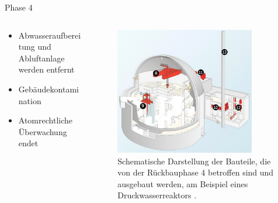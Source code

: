 \begin{frame}{Phase 4}
  \begin{columns}

    \begin{column}{0.48\textwidth}
      \begin{itemize}
        \setlength\itemsep{1.2em}
        \item{ Abwasseraufbereitung und Abluftanlage werden entfernt}
        \item{ Gebäudekontamination }
        \item{ Atomrechtliche Überwachung endet}
      \end{itemize}
    \end{column}

    \begin{column}{0.48\textwidth}
      \begin{figure}
         \centering
         \includegraphics[width=0.85\textwidth]{./bilder/abbau_phase_4_spiegel.png}
         \caption{Schematische Darstellung der Bauteile, die von der Rückbauphase 4 betroffen sind und ausgebaut werden, am Beispiel eines Druckwasserreaktors \cite{abbau_grafik_stade}. }
         \label{ fig: phase_4 }
       \end{figure}
    \end{column}

  \end{columns}
\end{frame}




